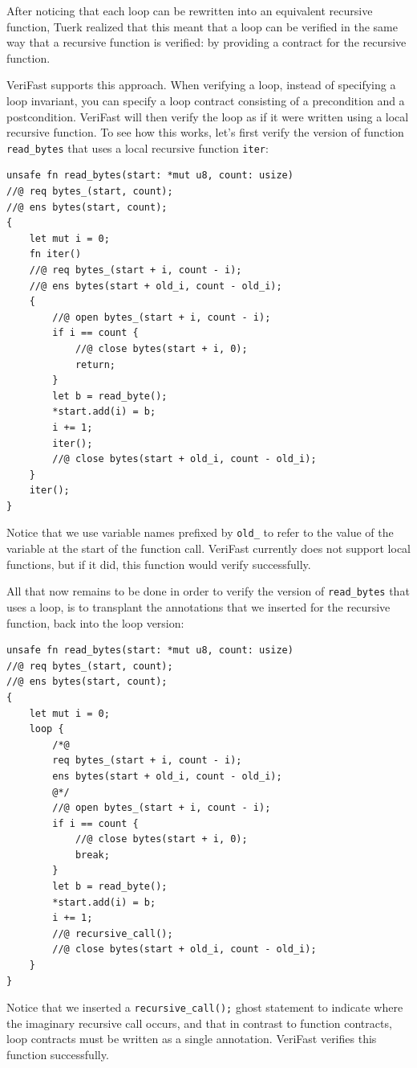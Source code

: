 \documentclass{article}
\begin{document}
After noticing that each loop can be rewritten into an equivalent recursive function, Tuerk realized that this meant that a loop can be verified
in the same way that a recursive function is verified: by providing a contract for the recursive function.

VeriFast supports this approach. When verifying a loop, instead of specifying a loop invariant, you can specify a loop contract consisting of a
precondition and a postcondition. VeriFast will then verify the loop as if it were written using a local recursive function. To see how this works, let's
first verify the version of function \lstinline!read_bytes! that uses a local recursive function \lstinline!iter!:
\begin{lstlisting}
unsafe fn read_bytes(start: *mut u8, count: usize)
//@ req bytes_(start, count);
//@ ens bytes(start, count);
{
    let mut i = 0;
    fn iter()
    //@ req bytes_(start + i, count - i);
    //@ ens bytes(start + old_i, count - old_i);
    {
        //@ open bytes_(start + i, count - i);
        if i == count {
            //@ close bytes(start + i, 0);
            return;
        }
        let b = read_byte();
        *start.add(i) = b;
        i += 1;
        iter();
        //@ close bytes(start + old_i, count - old_i);
    }
    iter();
}
\end{lstlisting}
Notice that we use variable names prefixed by \lstinline!old_! to refer to the value of the variable at the start of the function call.
VeriFast currently does not support local functions, but if it did, this function would verify successfully.

All that now remains to be done in order to verify the version of \lstinline!read_bytes! that uses a loop, is to transplant the
annotations that we inserted for the recursive function, back into the loop version:
\begin{lstlisting}
unsafe fn read_bytes(start: *mut u8, count: usize)
//@ req bytes_(start, count);
//@ ens bytes(start, count);
{
    let mut i = 0;
    loop {
        /*@
        req bytes_(start + i, count - i);
        ens bytes(start + old_i, count - old_i);
        @*/
        //@ open bytes_(start + i, count - i);
        if i == count {
            //@ close bytes(start + i, 0);
            break;
        }
        let b = read_byte();
        *start.add(i) = b;
        i += 1;
        //@ recursive_call();
        //@ close bytes(start + old_i, count - old_i);
    }
}
\end{lstlisting}
Notice that we inserted a \lstinline!recursive_call();! ghost statement to indicate where the imaginary recursive call occurs, and that in contrast to function contracts, loop contracts must be written as a single annotation. VeriFast verifies
this function successfully.
\end{document}
